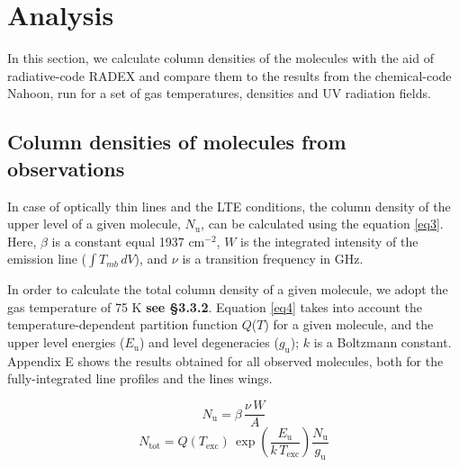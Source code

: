 \documentclass{aa}
\begin{document}
\section{Analysis}
In this section, we calculate column densities of the molecules with the aid 
of radiative-code RADEX and compare them to the results from the chemical-code Nahoon, 
run for a set of gas temperatures, densities and UV radiation fields. 
\subsection{Column densities of molecules from observations}

In case of optically thin lines and the LTE conditions, the column density of the 
upper level of a given molecule, $N_\mathrm{u}$, can be calculated using the equation \ref{eq3}. 
Here, $\beta$ is a constant equal 1937 cm$^{-2}$, $W$ is the integrated
intensity of the emission line ($\int{T_{mb} \, dV}$), and $\nu$ is a transition 
frequency in GHz. 

In order to calculate the total column density of a given molecule, 
we adopt the gas temperature of 75 K \textbf{see \S 3.3.2}. Equation \ref{eq4} takes into account the 
temperature-dependent partition function $Q$($T$) for a given molecule, and 
the upper level energies ($E_\mathrm{u}$) and level degeneracies ($g_\mathrm{u}$);
$k$ is a Boltzmann constant. Appendix E shows the results obtained for all observed 
molecules, both for the fully-integrated line profiles and the lines wings.


\begin{equation} 
\label{eq3} N_\mathrm{u} = \beta \, \frac{\nu \,W}{A} 
\end{equation} 
\begin{equation} 
\label{eq4} N_\mathrm{tot} = Q(T_\mathrm{exc}) \, \exp(\frac{E_\mathrm{u}}{k \, T_\mathrm{exc}})  \frac{N_\mathrm{u} }{g_\mathrm{u} } 
\end{equation} 
\end{document}
